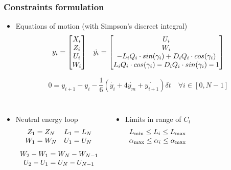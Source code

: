\documentclass[compress]{beamer}
\begin{document}
\begin{frame}
  \frametitle{Constraints formulation}
  \begin{itemize}
    \item Equations of motion (with Simpson's discreet integral)
      \begin{equation*}
	\begin{array}[c]{cc}
	  y_i= \begin{bmatrix}
	    X_i \\
	    Z_i \\
	    U_i \\
	    W_i 
	  \end{bmatrix} &

	  \dot{y_i} = 
	  \begin{bmatrix}
	    U_i \\
	    W_i \\
	    -L_i Q_i \cdot sin(\gamma_i) + D_i Q_i \cdot cos(\gamma_i) \\
	    L_i Q_i  \cdot cos(\gamma_i ) - D_i Q_i  \cdot sin(\gamma_i ) - 1
	  \end{bmatrix}
	\end{array}
      \end{equation*}

      \begin{equation*}
	0=y_{i+1} - y_i - \frac{1}{6}( \dot{y_i} + 4 \dot{y_m} + \dot{y_{i+1}})\delta t \quad \forall i \in [0,N-1]
      \end{equation*}
  \end{itemize}

  \begin{columns}[t]
    \begin{itemize}
      \item Neutral energy loop
	\begin{equation*}
	  \begin{array}[c]{cc}
	    Z_1 = Z_N & L_1 = L_N \\
	    W_1 = W_N & U_1 = U_N
	  \end{array}
	\end{equation*}
	\begin{equation*}
	  \begin{array}[c]{c}
	    W_2 - W_1 = W_N - W_{N-1} \\
	    U_2 - U_1 = U_N - U_{N-1} 
	  \end{array}
	\end{equation*}
    \end{itemize}
    \begin{itemize}
      \item Limits in range of $C_l$
	\begin{equation*}
	  \begin{array}[c]{c}
	    L_{\min} \le L_i \le L_{\max} \\
	    \alpha_{\max} \le \alpha_i \le \alpha_{\max}
	  \end{array}
	\end{equation*}
    \end{itemize}
  \end{columns}
\end{frame}
\end{document}

